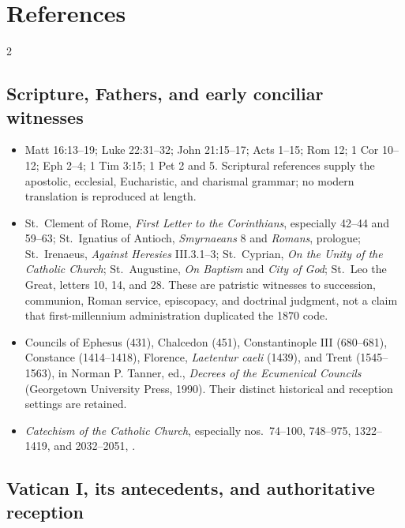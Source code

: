 \section{References}

\begingroup
\setlength{\parskip}{0.15em}
\titlespacing*{\subsection}{0pt}{1.35ex}{0.45ex}
\begin{multicols}{2}
\raggedcolumns

\subsection*{Scripture, Fathers, and early conciliar witnesses}

{\footnotesize
\begin{itemize}[itemsep=0.1em,topsep=0.15em]
\item Matt 16:13--19; Luke 22:31--32; John 21:15--17; Acts 1--15; Rom 12; 1 Cor 10--12; Eph 2--4; 1 Tim 3:15; 1 Pet 2 and 5. Scriptural references supply the apostolic, ecclesial, Eucharistic, and charismal grammar; no modern translation is reproduced at length.
\item St.~Clement of Rome, \emph{First Letter to the Corinthians}, especially 42--44 and 59--63; St.~Ignatius of Antioch, \emph{Smyrnaeans} 8 and \emph{Romans}, prologue; St.~Irenaeus, \emph{Against Heresies} III.3.1--3; St.~Cyprian, \emph{On the Unity of the Catholic Church}; St.~Augustine, \emph{On Baptism} and \emph{City of God}; St.~Leo the Great, letters 10, 14, and 28. These are patristic witnesses to succession, communion, Roman service, episcopacy, and doctrinal judgment, not a claim that first-millennium administration duplicated the 1870 code.
\item Councils of Ephesus (431), Chalcedon (451), Constantinople III (680--681), Constance (1414--1418), Florence, \emph{Laetentur caeli} (1439), and Trent (1545--1563), in Norman P. Tanner, ed., \emph{Decrees of the Ecumenical Councils} (Georgetown University Press, 1990). Their distinct historical and reception settings are retained.
\item \emph{Catechism of the Catholic Church}, especially nos.~74--100, 748--975, 1322--1419, and 2032--2051, .
\end{itemize}}

\subsection*{Vatican I, its antecedents, and authoritative reception}


\end{multicols}
